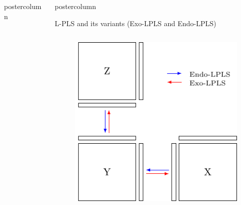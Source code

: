 \documentclass[9pt, final]{beamer}\usepackage[]{graphicx}\usepackage[]{color}
\newlength{\topcolumn}
\begin{document}
\begin{frame}[fragile]
\begin{columns}
\begin{column}{.49\textwidth}
\begin{beamercolorbox}[center, wd=\textwidth]{postercolumn}
\begin{minipage}[T]{.98\textwidth}
{}
        \end{minipage}
      \end{beamercolorbox}
\end{column}
    

\begin{column}{.49\textwidth}
      \begin{beamercolorbox}[center,wd=\textwidth]{postercolumn}
        \begin{minipage}[T]{.98\textwidth} 
          \parbox[t][\topcolumn]{\textwidth}{ 
            \begin{block}{L-PLS and its variants (Exo-LPLS and Endo-LPLS)} %
            	\begin{columns}[b]
            		\begin{column}{0.35\textwidth}
            			\begin{figure}
            				\centering
            				\includegraphics[width = \textwidth]{figure/lpls}

\end{figure}
\end{column}
\end{columns}
\end{block}}
\end{minipage}
\end{beamercolorbox}
\end{column}
\end{columns}
\end{frame}
\end{document}
